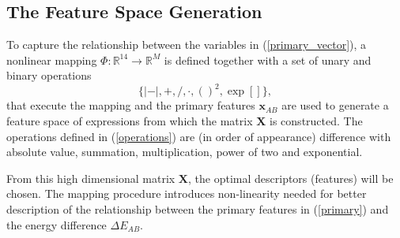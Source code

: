 \documentclass[11pt,oneside,czech,american]{book} %
\theoremstyle{definition} %
\theoremstyle{definition}
\renewcommand{\vec}[1]{\boldsymbol{#1}}
\begin{document}
\subsection{The Feature Space Generation}
To capture the relationship between the variables in (\ref{primary_vector}), a nonlinear mapping $\Phi: \mathbb{R}^{14} \rightarrow \mathbb{R}^{M}$ is defined together with a set of unary and binary operations
\begin{equation}
	\big\{|-|, +, /, \cdot, ()^2, \exp[]\big\},
	\label{operations}
\end{equation}
  that execute the mapping and the primary features $\textbf{x}_{AB}$ are used to generate a feature space of expressions from which the matrix $\vec{X}$ is constructed. The operations defined in (\ref{operations}) are (in order of appearance) difference with absolute value, summation, multiplication, power of two and exponential.
  
   From this high dimensional matrix $\bm{X}$, the optimal descriptors (features) will be chosen. The mapping procedure introduces non-linearity needed for better description of the relationship between the primary features in (\ref{primary}) and the energy difference $\Delta E_{AB}$.%
\end{document}
